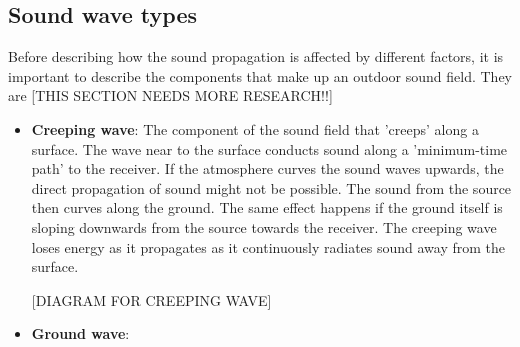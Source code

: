 \subsection{Sound wave types}
Before describing how the sound propagation is affected by different factors, it is important to describe the components that make up an outdoor sound field. They are [THIS SECTION NEEDS MORE RESEARCH!!]
\begin{itemize}
    \item \textbf{Creeping wave}: The component of the sound field that 'creeps' along a surface. The wave near to the surface conducts sound along a 'minimum-time path' to the receiver. If the atmosphere curves the sound waves upwards, the direct propagation of sound might not be possible. The sound from the source then curves along the ground. The same effect happens if the ground itself is sloping downwards from the source towards the receiver. The creeping wave loses energy as it propagates as it continuously radiates sound away from the surface. 
    
    [DIAGRAM FOR CREEPING WAVE]
    
    \item \textbf{Ground wave}: 
    
\end{itemize}